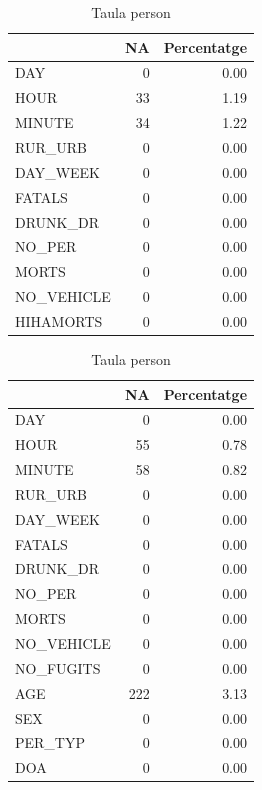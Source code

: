 \documentclass[12pt,longbibliography]{article}
\theoremstyle{definition}
\theoremstyle{remark}
\begin{document}
\begin{table}[H]
\parbox{.45\linewidth}{
\centering
\begin{tabular}{l|r|r|}
\cline{2-3}
\textbf{} & \multicolumn{1}{l|}{\textbf{NA}} & \multicolumn{1}{l|}{\textbf{Percentatge}} \\ \hline
\multicolumn{1}{|l|}{DAY}         & 0  & 0.00 \\ \hline
\multicolumn{1}{|l|}{HOUR}        & 33 & 1.19 \\ \hline
\multicolumn{1}{|l|}{MINUTE}      & 34 & 1.22 \\ \hline
\multicolumn{1}{|l|}{RUR\_URB}    & 0  & 0.00 \\ \hline
\multicolumn{1}{|l|}{DAY\_WEEK}   & 0  & 0.00 \\ \hline
\multicolumn{1}{|l|}{FATALS}      & 0  & 0.00 \\ \hline
\multicolumn{1}{|l|}{DRUNK\_DR}   & 0  & 0.00 \\ \hline
\multicolumn{1}{|l|}{NO\_PER}     & 0  & 0.00 \\ \hline
\multicolumn{1}{|l|}{MORTS}       & 0  & 0.00 \\ \hline
\multicolumn{1}{|l|}{NO\_VEHICLE} & 0  & 0.00 \\ \hline
\multicolumn{1}{|l|}{HIHAMORTS}   & 0  & 0.00 \\ \hline
\end{tabular}
\caption{Taula accident\label{table:t1}}
}
\hfill
\parbox{.45\linewidth}{
\centering
\begin{tabular}{l|r|r|}
\cline{2-3}
\textbf{} & \multicolumn{1}{l|}{\textbf{NA}} & \multicolumn{1}{l|}{\textbf{Percentatge}} \\ \hline
\multicolumn{1}{|l|}{DAY}         & 0   & 0.00 \\ \hline
\multicolumn{1}{|l|}{HOUR}        & 55  & 0.78 \\ \hline
\multicolumn{1}{|l|}{MINUTE}      & 58  & 0.82 \\ \hline
\multicolumn{1}{|l|}{RUR\_URB}    & 0   & 0.00 \\ \hline
\multicolumn{1}{|l|}{DAY\_WEEK}   & 0   & 0.00 \\ \hline
\multicolumn{1}{|l|}{FATALS}      & 0   & 0.00 \\ \hline
\multicolumn{1}{|l|}{DRUNK\_DR}   & 0   & 0.00 \\ \hline
\multicolumn{1}{|l|}{NO\_PER}     & 0   & 0.00 \\ \hline
\multicolumn{1}{|l|}{MORTS}       & 0   & 0.00 \\ \hline
\multicolumn{1}{|l|}{NO\_VEHICLE} & 0   & 0.00 \\ \hline
\multicolumn{1}{|l|}{NO\_FUGITS}  & 0   & 0.00 \\ \hline
\multicolumn{1}{|l|}{AGE}         & 222 & 3.13 \\ \hline
\multicolumn{1}{|l|}{SEX}         & 0   & 0.00 \\ \hline
\multicolumn{1}{|l|}{PER\_TYP}    & 0   & 0.00 \\ \hline
\multicolumn{1}{|l|}{DOA}         & 0   & 0.00 \\ \hline
\end{tabular}
\caption{Taula person\label{table:t2}}
}
\end{table}
\end{document}
